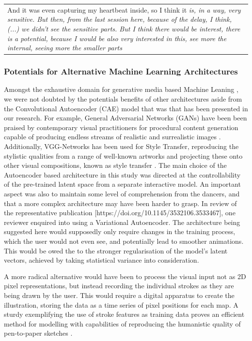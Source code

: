 \begin{center}
\begin{tabular}{ p{13cm}} 
And it was even capturing my heartbeat inside, so I think it \textit{is, in a way, very sensitive. But then, from the last session here, because of the delay, I think, (...) we didn't see the sensitive parts. But I think there would be interest, there is a potential, because I would be also very interested in this, see more the internal, seeing more the smaller parts}
\end{tabular}
\end{center}

\subsubsection{Potentials for Alternative Machine Learning Architectures}

Amongst the exhaustive domain for generative media based Machine Leaning \cite{hertzmann_aesthetics_2019}, we were not doubted by the potentials benefits of other architectures aside from the Convolutional Autoencoder (CAE) model that was that has been presented in our research. For example, General Adversarial Networks (GANs) have been been praised by contemporary visual practitioners for procedural content generation capable of producing endless streams of realistic and surrealistic images \cite{karras_style-based_2019,Elgammal2017CANCA}. Additionally, VGG-Networks has been used for Style Transfer, reproducing the stylistic qualities from a range of well-known artworks and projecting these onto other visual compositions, known as style transfer \cite{gatys_neural_2015}. The main choice of the Autoencoder based architecture in this study was directed at the controllability of the pre-trained latent space from a separate interactive model. An important aspect was also to maintain some level of comprehension from the dancers, and that a more complex architecture may have been harder to grasp. 
In review of the representative publication [https://doi.org/10.1145/3532106.3533467], one reviewer enquired into using a Variational Autoencoder. The architecture being suggested here would supposedly only require changes in the training process, which the user would not even see, and potentially lead to smoother animations. This would be owed the to the stronger regularisation of the model's latent vectors, achieved by taking statistical variance into consideration.

A more radical alternative would have been to process the visual input not as 2D pixel representations, but instead recording the individual strokes as they are being drawn by the user. This would require a digital apparatus to create the illustration, storing the data as a time series of pixel positions for each map. A sturdy exemplifying the use of stroke features as training data proves an efficient method for modelling with capabilities of reproducing the humanistic quality of pen-to-paper sketches \cite{ha_neural_2017}.

